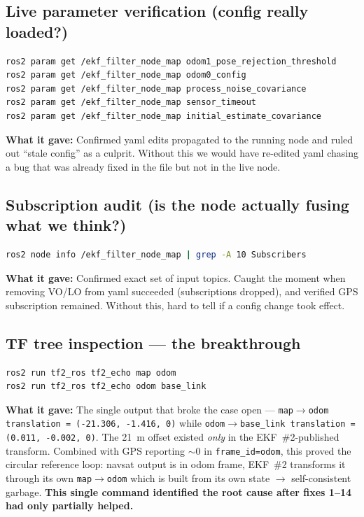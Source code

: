 \documentclass[11pt,a4paper]{article}
\begin{document}
\subsection{Live parameter verification (config really loaded?)}

\begin{lstlisting}[language=bash]
ros2 param get /ekf_filter_node_map odom1_pose_rejection_threshold
ros2 param get /ekf_filter_node_map odom0_config
ros2 param get /ekf_filter_node_map process_noise_covariance
ros2 param get /ekf_filter_node_map sensor_timeout
ros2 param get /ekf_filter_node_map initial_estimate_covariance
\end{lstlisting}
\noindent\textbf{What it gave:} Confirmed yaml edits propagated to the running node and
ruled out ``stale config'' as a culprit. Without this we would have re-edited yaml
chasing a bug that was already fixed in the file but not in the live node.

\subsection{Subscription audit (is the node actually fusing what we think?)}

\begin{lstlisting}[language=bash]
ros2 node info /ekf_filter_node_map | grep -A 10 Subscribers
\end{lstlisting}
\noindent\textbf{What it gave:} Confirmed exact set of input topics. Caught the moment when
removing VO/LO from yaml succeeded (subscriptions dropped), and verified GPS subscription
remained. Without this, hard to tell if a config change took effect.

\subsection{TF tree inspection --- the breakthrough}

\begin{lstlisting}[language=bash]
ros2 run tf2_ros tf2_echo map odom
ros2 run tf2_ros tf2_echo odom base_link
\end{lstlisting}
\noindent\textbf{What it gave:} The single output that broke the case open ---
\texttt{map$\to$odom translation = (-21.306, -1.416, 0)} while
\texttt{odom$\to$base\_link translation = (0.011, -0.002, 0)}. The 21~m offset existed
\emph{only} in the EKF~\#2-published transform. Combined with GPS reporting $\sim\!0$ in
\texttt{frame\_id=odom}, this proved the circular reference loop: navsat output is in
odom frame, EKF~\#2 transforms it through its own \texttt{map$\to$odom} which is built
from its own state $\to$ self-consistent garbage. \textbf{This single command identified
the root cause after fixes 1--14 had only partially helped.}
\end{document}
